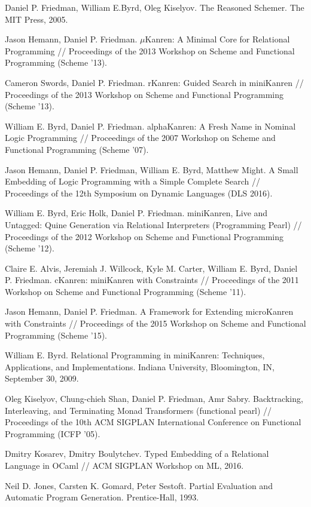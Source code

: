\documentclass[preprint,numbers,10pt]{sigplanconf}
\begin{document}
\begin{thebibliography}{99}
Daniel P. Friedman, William E.Byrd, Oleg Kiselyov. The Reasoned Schemer. The MIT
Press, 2005.

Jason Hemann, Daniel P. Friedman. $\mu$Kanren: A Minimal Core for Relational Programming //
Proceedings of the 2013 Workshop on Scheme and Functional Programming (Scheme '13).

Cameron Swords, Daniel P. Friedman. rKanren: Guided Search in miniKanren //
Proceedings of the 2013 Workshop on Scheme and Functional Programming (Scheme '13). 

William E. Byrd, Daniel P. Friedman. alphaKanren: A Fresh Name in Nominal Logic Programming //
Proceedings of the 2007 Workshop on Scheme and Functional Programming (Scheme '07).

Jason Hemann, Daniel P. Friedman, William E. Byrd, Matthew Might.
A Small Embedding of Logic Programming with a Simple Complete Search //
Proceedings of the 12th Symposium on Dynamic Languages (DLS 2016).

William E. Byrd, Eric Holk, Daniel P. Friedman.
miniKanren, Live and Untagged: Quine Generation via Relational Interpreters (Programming Pearl) //
Proceedings of the 2012 Workshop on Scheme and Functional Programming (Scheme '12).

Claire E. Alvis, Jeremiah J. Willcock, Kyle M. Carter, William E. Byrd, Daniel P. Friedman.
cKanren: miniKanren with Constraints // 
Proceedings of the 2011 Workshop on Scheme and Functional Programming (Scheme '11).

Jason Hemann, Daniel P. Friedman. A Framework for Extending microKanren with Constraints //
Proceedings of the 2015 Workshop on Scheme and Functional Programming (Scheme '15).

William E. Byrd. Relational Programming in miniKanren: Techniques, Applications, and Implementations.
Indiana University, Bloomington, IN, September 30, 2009.


Oleg Kiselyov, Chung-chieh Shan, Daniel P. Friedman, Amr Sabry. Backtracking, Interleaving, and Terminating Monad Transformers (functional pearl) //
Proceedings of the 10th ACM SIGPLAN International Conference on Functional Programming (ICFP '05).

Dmitry Kosarev, Dmitry Boulytchev. Typed Embedding of a Relational Language in OCaml // ACM SIGPLAN Workshop on ML, 2016.

Neil D. Jones, Carsten K. Gomard, Peter Sestoft. Partial Evaluation and Automatic Program Generation. Prentice-Hall, 1993.

\end{thebibliography}
\end{document}
